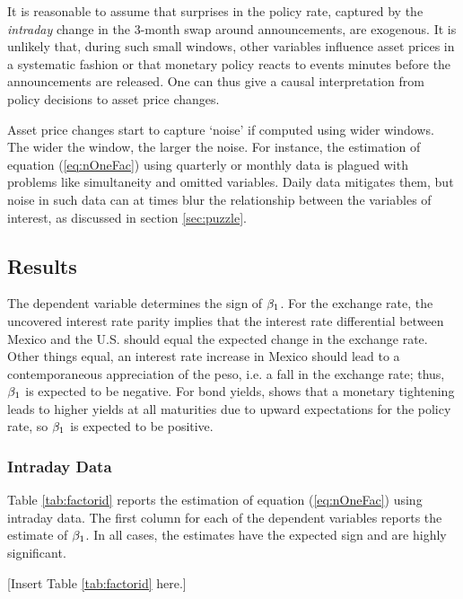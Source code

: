 \documentclass[a4paper,12pt]{article} 		%
\begin{document}
It is reasonable to assume that surprises in the policy rate, captured by the \textit{intraday} change in the 3-month swap around announcements, are exogenous. It is unlikely that, during such small windows, other variables influence asset prices in a systematic fashion or that monetary policy reacts to events minutes before the announcements are released. One can thus give a causal interpretation from policy decisions to asset price changes. 

Asset price changes start to capture `noise' if computed using wider windows. The wider the window, the larger the noise. For instance, the estimation of equation (\ref{eq:nOneFac}) using quarterly or monthly data is plagued with problems like simultaneity and omitted variables. Daily data mitigates them, but noise in such data can at times blur the relationship between the variables of interest, as discussed in section \ref{sec:puzzle}. 

\sectitlespace
\subsection{Results}
\sectitlespace
The dependent variable determines the sign of \(\beta_{1}\). For the exchange rate, the uncovered interest rate parity implies that the interest rate differential between Mexico and the U.S. should equal the expected change in the exchange rate. Other things equal, an interest rate increase in Mexico should lead to a contemporaneous appreciation of the peso, i.e. a fall in the exchange rate; thus, \(\beta_{1}\) is expected to be negative. For bond yields, \textcite{Kuttner:2001} shows that a monetary tightening leads to higher yields at all maturities due to upward expectations for the policy rate, so \(\beta_{1}\) is expected to be positive. 

\sectitlespace
\subsubsection{Intraday Data}
\sectitlespace
Table \ref{tab:factorid} reports the estimation of equation (\ref{eq:nOneFac}) using intraday data. The first column for each of the dependent variables reports the estimate of \(\beta_{1}\). In all cases, the estimates have the expected sign and are highly significant.

\begin{center}
	[Insert Table \ref{tab:factorid} here.]
\end{center}
\end{document}

